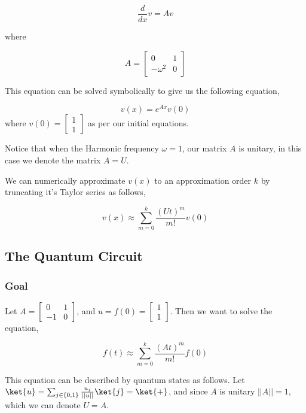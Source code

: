 \documentclass[11pt]{article}
\begin{document}
\begin{equation}
\frac{d}{dx} v = Av
\end{equation}

where

\begin{equation}
A = \begin{bmatrix}0 & 1\\ -\omega^{2} & 0\end{bmatrix}
\end{equation}

This equation can be solved symbolically to give us the following equation,

\begin{equation}
v(x) = e^{Ax}v(0)
\end{equation}
where \(v(0) = \begin{bmatrix}1 \\ 1\end{bmatrix}\) as per our initial equations.

Notice that when the Harmonic frequency \(\omega = 1\), our matrix \(A\) is unitary, in this case we denote the matrix \(A = U\).

We can numerically approximate \(v(x)\) to an approximation order \(k\) by truncating it's Taylor series as follows,

\begin{equation}
v(x) \approx \sum^{k}_{m=0} \frac{(Ut)^{m}}{m!}v(0)
\end{equation}
\subsection{The Quantum Circuit}
\label{sec:org56173b6}
\subsubsection{Goal}
\label{sec:org4a16c94}
Let \(A = \begin{bmatrix}0 & 1\\ -1 & 0\end{bmatrix}\), and \(u = f(0) = \begin{bmatrix}1\\ 1\end{bmatrix}\). Then we want to solve the equation,

\begin{equation}
f(t)\approx \sum^{k}_{m=0}\frac{(At)^{m}}{m!}f(0)
\end{equation}

This equation can be described by quantum states as follows. Let \(\ket{u}=\sum_{j\in \{0,1\}}\frac{u_{j}}{||u||}\ket{j}=\ket{+}\), and since \(A\) is unitary \(||A||=1\), which we can denote \(U=A\).
\end{document}
